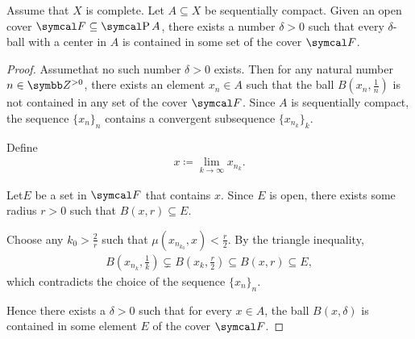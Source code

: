 \begin{lemma}\label{thm:lebesgue_covering_lemma}
  Assume that $X$ is complete. Let $A \subseteq X$ be sequentially compact. Given an open cover $\Cal{F} \subseteq \Power A$, there exists a number $\delta > 0$ such that every $\delta$-ball with a center in $A$ is contained in some set of the cover $\Cal{F}$.
\end{lemma}
\begin{proof}
  Assume\LEM that no such number $\delta > 0$ exists. Then for any natural number $n \in \BB{Z}^{>0}$, there exists an element $x_n \in A$ such that the ball $B(x_n, \frac 1 n)$ is not contained in any set of the cover $\Cal{F}$. Since $A$ is sequentially compact, the sequence $\{ x_n \}_n$ contains a convergent subsequence $\{ x_{n_k} \}_k$.

  Define
  \begin{align*}
    x \coloneqq \lim_{k \to \infty} x_{n_k}.
  \end{align*}

  Let\AOC $E$ be a set in $\Cal{F}$ that contains $x$. Since $E$ is open, there exists some radius $r > 0$ such that $B(x, r) \subseteq E$.

  Choose any $k_0 > \frac 2 r$ such that $\mu(x_{n_{k_0}}, x) < \frac r 2$. By the triangle inequality,
  \begin{align*}
    B \left(x_{n_k}, \frac 1 k \right) \subsetneq B \left(x_k, \frac r 2 \right) \subseteq B(x, r) \subseteq E,
  \end{align*}
  which contradicts the choice of the sequence $\{ x_n \}_n$.

  Hence there exists a $\delta > 0$ such that for every $x \in A$, the ball $B(x, \delta)$ is contained in some element $E$ of the cover $\Cal{F}$.
\end{proof}

